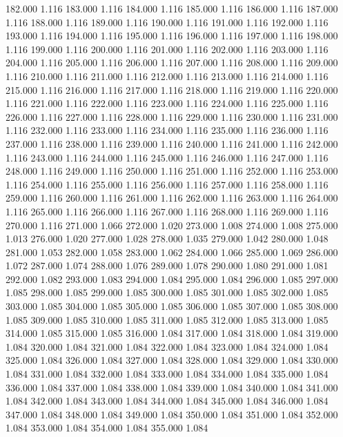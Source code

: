 182.000 1.116 
183.000 1.116 
184.000 1.116 
185.000 1.116 
186.000 1.116 
187.000 1.116 
188.000 1.116 
189.000 1.116 
190.000 1.116 
191.000 1.116 
192.000 1.116 
193.000 1.116 
194.000 1.116 
195.000 1.116 
196.000 1.116 
197.000 1.116 
198.000 1.116 
199.000 1.116 
200.000 1.116 
201.000 1.116 
202.000 1.116 
203.000 1.116 
204.000 1.116 
205.000 1.116 
206.000 1.116 
207.000 1.116 
208.000 1.116 
209.000 1.116 
210.000 1.116 
211.000 1.116 
212.000 1.116 
213.000 1.116 
214.000 1.116 
215.000 1.116 
216.000 1.116 
217.000 1.116 
218.000 1.116 
219.000 1.116 
220.000 1.116 
221.000 1.116 
222.000 1.116 
223.000 1.116 
224.000 1.116 
225.000 1.116 
226.000 1.116 
227.000 1.116 
228.000 1.116 
229.000 1.116 
230.000 1.116 
231.000 1.116 
232.000 1.116 
233.000 1.116 
234.000 1.116 
235.000 1.116 
236.000 1.116 
237.000 1.116 
238.000 1.116 
239.000 1.116 
240.000 1.116 
241.000 1.116 
242.000 1.116 
243.000 1.116 
244.000 1.116 
245.000 1.116 
246.000 1.116 
247.000 1.116 
248.000 1.116 
249.000 1.116 
250.000 1.116 
251.000 1.116 
252.000 1.116 
253.000 1.116 
254.000 1.116 
255.000 1.116 
256.000 1.116 
257.000 1.116 
258.000 1.116 
259.000 1.116 
260.000 1.116 
261.000 1.116 
262.000 1.116 
263.000 1.116 
264.000 1.116 
265.000 1.116 
266.000 1.116 
267.000 1.116 
268.000 1.116 
269.000 1.116 
270.000 1.116 
271.000 1.066 
272.000 1.020 
273.000 1.008 
274.000 1.008 
275.000 1.013 
276.000 1.020 
277.000 1.028 
278.000 1.035 
279.000 1.042 
280.000 1.048 
281.000 1.053 
282.000 1.058 
283.000 1.062 
284.000 1.066 
285.000 1.069 
286.000 1.072 
287.000 1.074 
288.000 1.076 
289.000 1.078 
290.000 1.080 
291.000 1.081 
292.000 1.082 
293.000 1.083 
294.000 1.084 
295.000 1.084 
296.000 1.085 
297.000 1.085 
298.000 1.085 
299.000 1.085 
300.000 1.085 
301.000 1.085 
302.000 1.085 
303.000 1.085 
304.000 1.085 
305.000 1.085 
306.000 1.085 
307.000 1.085 
308.000 1.085 
309.000 1.085 
310.000 1.085 
311.000 1.085 
312.000 1.085 
313.000 1.085 
314.000 1.085 
315.000 1.085 
316.000 1.084 
317.000 1.084 
318.000 1.084 
319.000 1.084 
320.000 1.084 
321.000 1.084 
322.000 1.084 
323.000 1.084 
324.000 1.084 
325.000 1.084 
326.000 1.084 
327.000 1.084 
328.000 1.084 
329.000 1.084 
330.000 1.084 
331.000 1.084 
332.000 1.084 
333.000 1.084 
334.000 1.084 
335.000 1.084 
336.000 1.084 
337.000 1.084 
338.000 1.084 
339.000 1.084 
340.000 1.084 
341.000 1.084 
342.000 1.084 
343.000 1.084 
344.000 1.084 
345.000 1.084 
346.000 1.084 
347.000 1.084 
348.000 1.084 
349.000 1.084 
350.000 1.084 
351.000 1.084 
352.000 1.084 
353.000 1.084 
354.000 1.084 
355.000 1.084 
